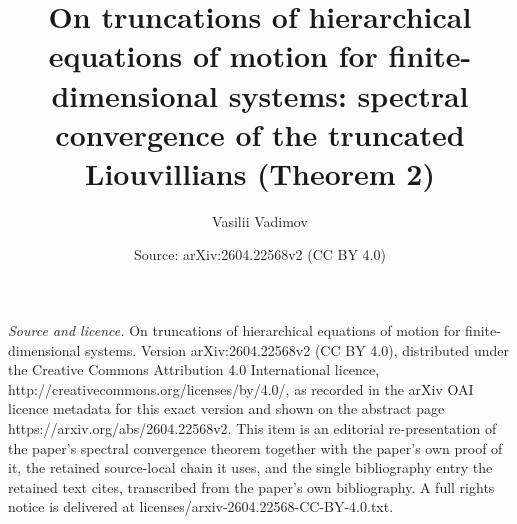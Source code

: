 \documentclass[10pt,a4paper]{amsart}
\title[On truncations of hierarchical equations of motion]{On truncations of hierarchical equations of motion for finite-dimensional systems: spectral convergence of the truncated Liouvillians (Theorem 2)}
\author[Vasilii Vadimov]{Vasilii Vadimov}
\date{Source: arXiv:2604.22568v2 (CC BY 4.0)}
\begin{document}
\maketitle
\vspace{1em}
\noindent\textit{Source and licence.} On truncations of hierarchical equations of motion for finite-dimensional systems. Version arXiv:2604.22568v2 (CC BY 4.0), distributed under the Creative Commons Attribution 4.0 International licence, http://creativecommons.org/licenses/by/4.0/, as recorded in the arXiv OAI licence metadata for this exact version and shown on the abstract page https://arxiv.org/abs/2604.22568v2. This item is an editorial re-presentation of the paper's spectral convergence theorem together with the paper's own proof of it, the retained source-local chain it uses, and the single bibliography entry the retained text cites, transcribed from the paper's own bibliography. A full rights notice is delivered at licenses/arxiv-2604.22568-CC-BY-4.0.txt.
\end{document}
